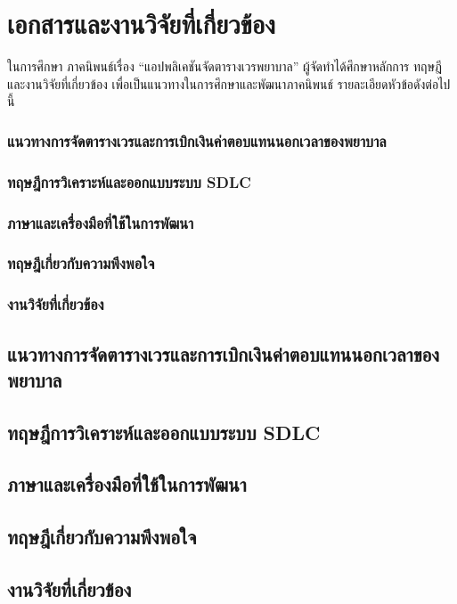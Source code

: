 \baselineskip=8mm
\chapter{เอกสารและงานวิจัยที่เกี่ยวข้อง}

\renewcommand{\thesubsection}{\arabic{subsection}.}
\renewcommand{\theequation}{\thesection.\arabic{equation}}
\renewcommand{\thesection}{}



ในการศึกษา ภาคนิพนธ์เรื่อง “แอปพลิเคชันจัดตารางเวรพยาบาล” ผู้จัดทำได้ศึกษาหลักการ ทฤษฎี และงานวิจัยที่เกี่ยวข้อง เพื่อเป็นแนวทางในการศึกษาและพัฒนาภาคนิพนธ์ รายละเอียดหัวข้อดังต่อไปนี้

\subsection{แนวทางการจัดตารางเวรและการเบิกเงินค่าตอบแทนนอกเวลาของพยาบาล}

\subsection{ทฤษฎีการวิเคราะห์และออกแบบระบบ SDLC}

\subsection{ภาษาและเครื่องมือที่ใช้ในการพัฒนา}

\subsection{ทฤษฎีเกี่ยวกับความพึงพอใจ}

\subsection{งานวิจัยที่เกี่ยวข้อง}

\section{แนวทางการจัดตารางเวรและการเบิกเงินค่าตอบแทนนอกเวลาของพยาบาล}

\section{ทฤษฎีการวิเคราะห์และออกแบบระบบ SDLC}

\section{ภาษาและเครื่องมือที่ใช้ในการพัฒนา}

\section{ทฤษฎีเกี่ยวกับความพึงพอใจ}

\section{งานวิจัยที่เกี่ยวข้อง}
